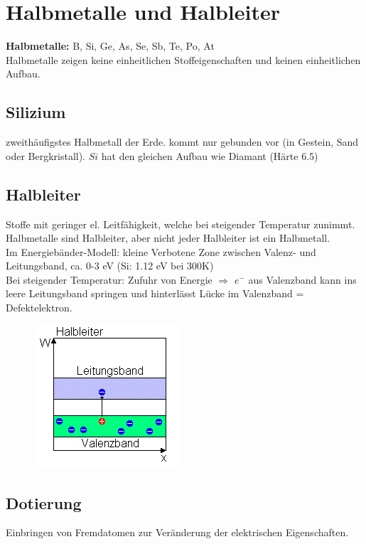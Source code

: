\section{Halbmetalle und Halbleiter}
\textbf{Halbmetalle:} B, Si, Ge, As, Se, Sb, Te, Po, At \\
Halbmetalle zeigen keine einheitlichen Stoffeigenschaften und keinen einheitlichen Aufbau.

\subsection{Silizium}
zweithäufigstes Halbmetall der Erde. kommt nur gebunden vor (in Gestein, Sand oder Bergkristall). $Si$ hat den gleichen Aufbau wie Diamant (Härte 6.5)

\subsection{Halbleiter}
Stoffe mit geringer el. Leitfähigkeit, welche bei steigender Temperatur zunimmt. Halbmetalle sind Halbleiter, aber nicht jeder Halbleiter ist ein Halbmetall. \\
Im Energiebänder-Modell: kleine Verbotene Zone zwischen Valenz- und Leitungsband, ca. 0-3 eV (Si: 1.12 eV bei 300K) \\
Bei steigender Temperatur: Zufuhr von Energie $\Rightarrow$ $e^-$ aus Valenzband kann ins leere Leitungsband springen und hinterlässt Lücke im Valenzband = Defektelektron.

\begin{figure}[htbp]
	\centering
	\includegraphics[width=0.4\linewidth]{images/4_Halbleiter_Energiebaender.png}
\end{figure}

\subsection{Dotierung}
Einbringen von Fremdatomen zur Veränderung der elektrischen Eigenschaften.

